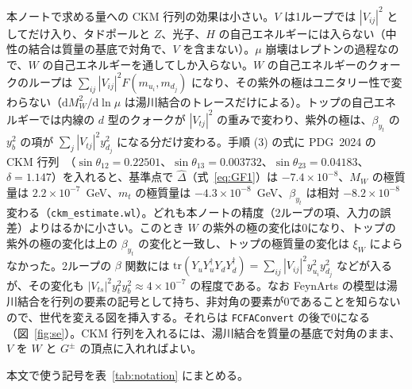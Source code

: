 \documentclass[a4paper,10pt]{ltjsarticle}
\newcommand{\dd}{\mathrm{d}}
\begin{document}
本ノートで求める量への CKM 行列の効果は小さい。$V$ は1ループでは $|V_{ij}|^2$ としてだけ入り、タドポールと $Z$、光子、$H$ の自己エネルギーには入らない（中性の結合は質量の基底で対角で、$V$ を含まない）。$\mu$ 崩壊はレプトンの過程なので、$W$ の自己エネルギーを通してしか入らない。$W$ の自己エネルギーのクォークのループは $\sum_{ij}|V_{ij}|^2F(m_{u_i},m_{d_j})$ になり、その紫外の極はユニタリー性で変わらない（$\dd M_W^2/\dd\ln\mu$ は湯川結合のトレースだけによる）。トップの自己エネルギーでは内線の $d$ 型のクォークが $|V_{tj}|^2$ の重みで変わり、紫外の極は、$\beta_{y_t}$ の $y_b^2$ の項が $\sum_j|V_{tj}|^2y_{d_j}^2$ になる分だけ変わる。手順 (3) の式に PDG~2024 の CKM 行列~\cite{pdg24}（$\sin\theta_{12}=0.22501$、$\sin\theta_{13}=0.003732$、$\sin\theta_{23}=0.04183$、$\delta=1.147$）を入れると、基準点で $\hat\Delta$（式~\eqref{eq:GF1}）は $-7.4\times10^{-8}$、$M_W$ の極質量は $2.2\times10^{-7}$~GeV、$m_t$ の極質量は $-4.3\times10^{-8}$~GeV、$\beta_{y_t}$ は相対 $-8.2\times10^{-8}$ 変わる（\texttt{ckm\_estimate.wl}）。どれも本ノートの精度（2ループの項、入力の誤差）よりはるかに小さい。このとき $W$ の紫外の極の変化は0になり、トップの紫外の極の変化は上の $\beta_{y_t}$ の変化と一致し、トップの極質量の変化は $\xi_W$ によらなかった。2ループの $\beta$ 関数には $\mathrm{tr}(Y_uY_u^\dagger Y_dY_d^\dagger)=\sum_{ij}|V_{ij}|^2y_{u_i}^2y_{d_j}^2$ などが入るが、その変化も $|V_{ts}|^2y_t^2y_b^2\approx4\times10^{-7}$ の程度である。なお FeynArts の模型は湯川結合を行列の要素の記号として持ち、非対角の要素が0であることを知らないので、世代を変える図を挿入する。それらは \texttt{FCFAConvert} の後で0になる（図~\ref{fig:se}）。CKM 行列を入れるには、湯川結合を質量の基底で対角のまま、$V$ を $W$ と $G^\pm$ の頂点に入れればよい。

本文で使う記号を表~\ref{tab:notation} にまとめる。
\end{document}
